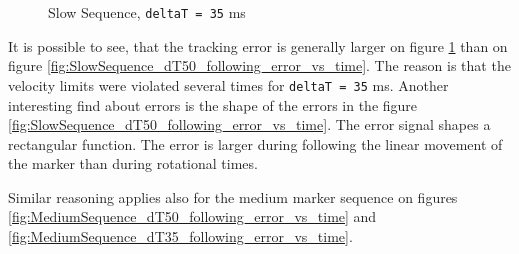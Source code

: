 \documentclass[]{scrartcl}
\begin{document}
\begin{figure}[!htp]
	\hfill
	\caption{Slow Sequence, \texttt{deltaT = 35} ms}
	\label{fig:SlowSequence_dT35_following_error_vs_time}
\end{figure}
It is possible to see, that the tracking error is generally larger on figure \ref{fig:SlowSequence_dT35_following_error_vs_time} than on figure \ref{fig:SlowSequence_dT50_following_error_vs_time}. The reason is that the velocity limits were violated several times for \texttt{deltaT = 35} ms. Another interesting find about errors is the shape of the errors in the figure \ref{fig:SlowSequence_dT50_following_error_vs_time}. The error signal shapes a rectangular function. The error is larger during following the linear movement of the marker than during rotational times.

Similar reasoning applies also for the medium marker sequence on figures \ref{fig:MediumSequence_dT50_following_error_vs_time} and \ref{fig:MediumSequence_dT35_following_error_vs_time}.
\end{document}
